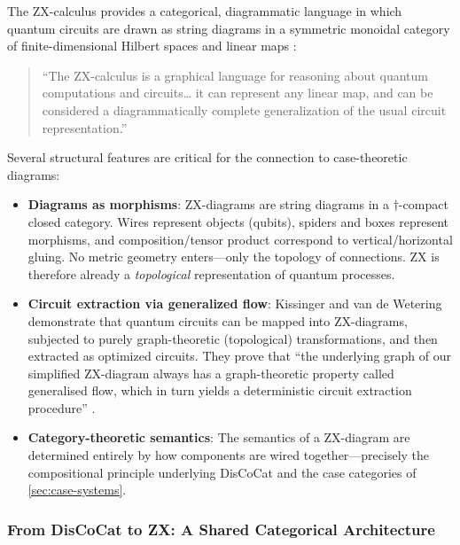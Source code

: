 \documentclass[
]{article}
\providecommand{\tightlist}{%
  \setlength{\itemsep}{0pt}\setlength{\parskip}{0pt}}
\numberwithin{equation}{section}
\begin{document}
The ZX-calculus provides a categorical, diagrammatic language in which
quantum circuits are drawn as string diagrams in a symmetric monoidal
category of finite-dimensional Hilbert spaces and linear maps
\citep{kissinger2020zx}:

\begin{quote}
``The ZX-calculus is a graphical language for reasoning about quantum
computations and circuits\ldots{} it can represent any linear map, and
can be considered a diagrammatically complete generalization of the
usual circuit representation.'' \citep{coeckekissinger2017}
\end{quote}

Several structural features are critical for the connection to
case-theoretic diagrams:

\begin{itemize}
\tightlist
\item
  \textbf{Diagrams as morphisms}: ZX-diagrams are string diagrams in a
  \(\dagger\)-compact closed category. Wires represent objects (qubits),
  spiders and boxes represent morphisms, and composition/tensor product
  correspond to vertical/horizontal gluing. No metric geometry
  enters---only the topology of connections. ZX is therefore already a
  \emph{topological} representation of quantum processes.
\item
  \textbf{Circuit extraction via generalized flow}: Kissinger and van de
  Wetering demonstrate that quantum circuits can be mapped into
  ZX-diagrams, subjected to purely graph-theoretic (topological)
  transformations, and then extracted as optimized circuits. They prove
  that ``the underlying graph of our simplified ZX-diagram always has a
  graph-theoretic property called generalised flow, which in turn yields
  a deterministic circuit extraction procedure''
  \citep{kissinger2020zx}.
\item
  \textbf{Category-theoretic semantics}: The semantics of a ZX-diagram
  are determined entirely by how components are wired
  together---precisely the compositional principle underlying DisCoCat
  and the case categories of \autoref{sec:case-systems}.
\end{itemize}

\subsubsection{From DisCoCat to ZX: A Shared Categorical
Architecture}\label{from-discocat-to-zx-a-shared-categorical-architecture}
\end{document}
